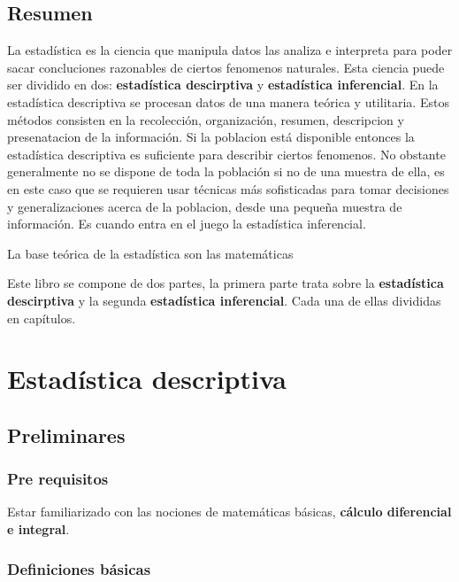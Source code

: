 \documentclass[
  11pt,
]{krantz}
\theoremstyle{definition}
\theoremstyle{definition}
\theoremstyle{definition}
\theoremstyle{definition}
\theoremstyle{remark}
\begin{document}
\hypertarget{resumen}{%
\chapter*{Resumen}\label{resumen}}


La estadística es la ciencia que manipula datos las analiza e interpreta para poder sacar concluciones razonables de ciertos fenomenos naturales. Esta ciencia puede ser dividido en dos: \textbf{estadística descirptiva} y \textbf{estadística inferencial}. En la estadística descriptiva se procesan datos de una manera teórica y utilitaria. Estos métodos consisten en la recolección, organización, resumen, descripcion y presenatacion de la información. Si la poblacion está disponible entonces la estadística descriptiva es suficiente para describir ciertos fenomenos. No obstante generalmente no se dispone de toda la población si no de una muestra de ella, es en este caso que se requieren usar técnicas más sofisticadas para tomar decisiones y generalizaciones acerca de la poblacion, desde una pequeña muestra de información. Es cuando entra en el juego la estadística inferencial.

La base teórica de la estadística son las matemáticas

Este libro se compone de dos partes, la primera parte trata sobre la \textbf{estadística descirptiva} y la segunda \textbf{estadística inferencial}. Cada una de ellas divididas en capítulos.

\mainmatter

\hypertarget{part-estaduxedstica-descriptiva}{%
\part{Estadística descriptiva}\label{part-estaduxedstica-descriptiva}}

\hypertarget{preliminares}{%
\chapter{Preliminares}\label{preliminares}}

\hypertarget{pre-requisitos}{%
\section{Pre requisitos}\label{pre-requisitos}}

Estar familiarizado con las nociones de matemáticas básicas, \textbf{cálculo diferencial e integral}.

\hypertarget{definiciones-buxe1sicas}{%
\section{Definiciones básicas}\label{definiciones-buxe1sicas}}
\end{document}
